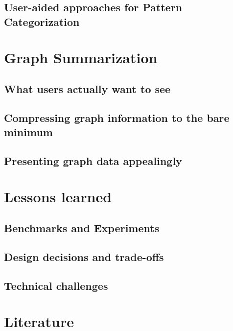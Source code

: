 \documentclass[
        a4paper,     %
        titlepage,   %
        twoside,     %
        parskip      %
        ]{scrartcl}  %
\begin{document}
    \subsection{User-aided approaches for Pattern Categorization}
  \section{Graph Summarization}
    \subsection{What users actually want to see}
    \subsection{Compressing graph information to the bare minimum}
    \subsection{Presenting graph data appealingly}
  \section{Lessons learned}
    \subsection{Benchmarks and Experiments}
    \subsection{Design decisions and trade-offs}
    \subsection{Technical challenges}

  \section{Literature}

  \clearpage
  
\end{document}
